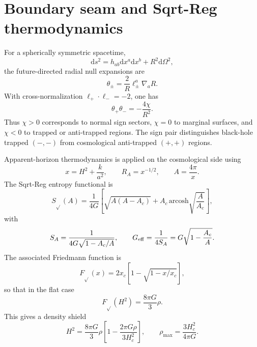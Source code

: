 \documentclass[11pt]{article}
\newcommand{\dd}{\mathrm{d}}
\begin{document}
\section{Boundary seam and Sqrt-Reg thermodynamics}\label{sec:seam}
For a spherically symmetric spacetime,
\begin{equation}
\dd s^2=h_{ab}\dd x^a\dd x^b+R^2\dd\Omega^2,
\end{equation}
the future-directed radial null expansions are
\begin{equation}
\theta_\pm=\frac{2}{R}\ell_\pm^a\nabla_a R.
\end{equation}
With cross-normalization $\ell_+\cdot\ell_-=-2$, one has
\begin{equation}
\theta_+\theta_-=-\frac{4\chi}{R^2}.
\end{equation}
Thus $\chi>0$ corresponds to normal sign sectors, $\chi=0$ to marginal surfaces, and $\chi<0$ to trapped or anti-trapped regions. The sign pair distinguishes black-hole trapped $(-,-)$ from cosmological anti-trapped $(+,+)$ regions.

Apparent-horizon thermodynamics is applied on the cosmological side using
\begin{equation}
x=H^2+\frac{k}{a^2},\qquad R_A=x^{-1/2},\qquad A=\frac{4\pi}{x}.
\end{equation}
The Sqrt-Reg entropy functional is
\begin{equation}
S_{\sqrt{}}(A)=\frac{1}{4G}\left[\sqrt{A(A-A_c)}+A_c\,\mathrm{arcosh}\sqrt{\frac{A}{A_c}}\right],
\end{equation}
with
\begin{equation}
S_A=\frac{1}{4G\sqrt{1-A_c/A}},\qquad G_{\rm eff}=\frac{1}{4S_A}=G\sqrt{1-\frac{A_c}{A}}.
\end{equation}
The associated Friedmann function is
\begin{equation}
F_{\sqrt{}}(x)=2x_c\left[1-\sqrt{1-x/x_c}\right],
\end{equation}
so that in the flat case
\begin{equation}
F_{\sqrt{}}(H^2)=\frac{8\pi G}{3}\rho.
\end{equation}
This gives a density shield
\begin{equation}
H^2=\frac{8\pi G}{3}\rho\left[1-\frac{2\pi G\rho}{3H_c^2}\right],\qquad \rho_{\max}=\frac{3H_c^2}{4\pi G}.
\end{equation}
\end{document}
